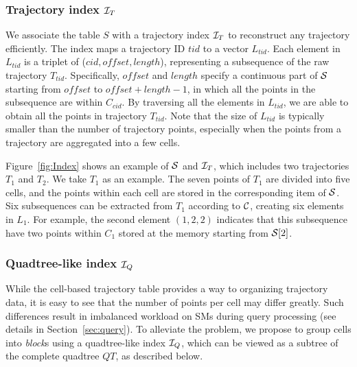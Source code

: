 \documentclass[10pt,conference,letterpaper]{IEEEtran}
\newcommand{\alltraj}{{{\cal T}}\xspace}
\newcommand{\allcell}{{\cal C}\xspace}
\newcommand{\trajtable}{{\cal S}\xspace}
\newcommand{\trajindex}{{{\cal I}_T}\xspace}
\newcommand{\treeindex}{{{\cal I}_Q}\xspace}
\begin{document}


\subsubsection{Trajectory index $\trajindex$}
We associate the table $S$ with a trajectory index $\trajindex$ to reconstruct any trajectory efficiently. The index maps a trajectory ID $tid$ to a vector $L_{tid}$. Each element in $L_{tid}$ is a triplet of ($cid, offset, length$), representing a subsequence of the raw trajectory $T_{tid}$. Specifically, $offset$ and $length$ specify a continuous part of $\trajtable$ starting from $offset$ to $offset+length-1$, in which all the points in the subsequence are within $C_{cid}$. By traversing all the elements in $L_{tid}$, we are able to obtain all the points in trajectory $T_{tid}$. Note that the size of $L_{tid}$ is typically smaller than the number of trajectory points, especially when the points from a trajectory are aggregated into a few cells.

Figure~\ref{fig:Index} shows an example of $\trajtable$ and $\trajindex$, which includes two trajectories $T_1$ and $T_2$. We take $T_1$ as an example. The seven points of $T_1$ are divided into five cells, and the points within each cell are stored in the corresponding item of $\trajtable$.
Six subsequences can be extracted from $T_1$ according to $\allcell$, creating six elements in $L_1$. For example, the second element $(1,2,2)$ indicates that this subsequence have two points within $C_1$ stored at the memory starting from $\trajtable[2]$.


\subsubsection{Quadtree-like index $\treeindex$}
While the cell-based trajectory table provides a way to organizing trajectory data, it is easy to see that the number of points per cell may differ greatly.
Such differences result in imbalanced workload on SMs during query processing (see details in Section~\ref{sec:query}). To alleviate the problem, we propose to group cells into \emph{block}s using a quadtree-like index $\treeindex$,
which can be viewed as a subtree of the complete quadtree $QT$, as described below.
\end{document}
